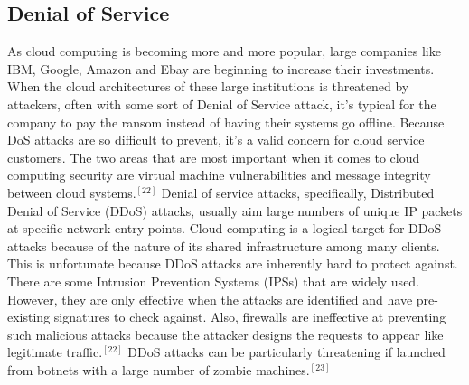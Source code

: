 \documentclass[a4paper, 8pt]{article} %
\begin{document}
\begin{doublespacing}
\subsection*{Denial of Service}

As cloud computing is becoming more and more popular, large companies like IBM, Google, Amazon and Ebay are beginning to increase their investments.  When the cloud architectures of these large institutions is threatened by attackers, often with some sort of Denial of Service attack, it's typical for the company to pay the ransom instead of having their systems go offline.  Because DoS attacks are so difficult to prevent, it's a valid concern for cloud service customers.  The two areas that are most important when it comes to cloud computing security are virtual machine vulnerabilities and message integrity between cloud systems.$^{[22]}$  Denial of service attacks, specifically, Distributed Denial of Service (DDoS) attacks, usually aim large numbers of unique IP packets at specific network entry points.  Cloud computing is a logical target for DDoS attacks because of the nature of its shared infrastructure among many clients.  This is unfortunate because DDoS attacks are inherently hard to protect against.  There are some Intrusion Prevention Systems (IPSs) that are widely used.  However, they are only effective when the attacks are identified and have pre-existing signatures to check against.  Also, firewalls are ineffective at preventing such malicious attacks because the attacker designs the requests to appear like legitimate traffic.$^{[22]}$  DDoS attacks can be particularly threatening if launched from botnets with a large number of zombie machines.$^{[23]}$  


\end{doublespacing}
\end{document}
